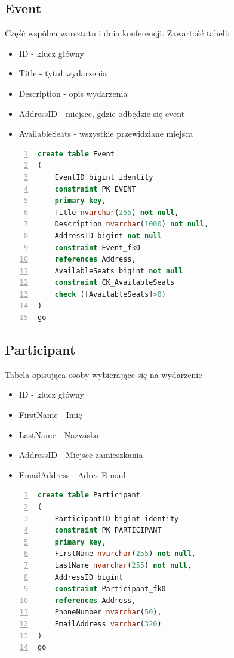 \documentclass[]{article}
\begin{document}
	\subsection{Event}
	Część wspólna warsztatu i dnia konferencji. Zawartość tabeli:
	\begin{itemize}
		\item ID - klucz główny
		\item Title - tytuł wydarzenia
		\item Description - opis wydarzenia
		\item AddressID - miejsce, gdzie odbędzie się event
		\item AvailableSeats - wszystkie przewidziane miejsca
	\end{itemize}
	\begin{lstlisting}[language=SQL,
						showspaces=false,
						basicstyle=\ttfamily,
						numbers=left,
						numberstyle=\tiny,
						backgroundcolor=\color{lightg},
						keywordstyle=\color{lightblue},
						commentstyle=\color{gray}]
create table Event
(
	EventID bigint identity
	constraint PK_EVENT
	primary key,
	Title nvarchar(255) not null,
	Description nvarchar(1000) not null,
	AddressID bigint not null
	constraint Event_fk0
	references Address,
	AvailableSeats bigint not null
	constraint CK_AvailableSeats
	check ([AvailableSeats]>0)
)
go
	\end{lstlisting}
	\subsection{Participant}
	Tabela opisująca osoby wybierające się na wydarzenie
	\begin{itemize}
		\item ID - klucz główny
		\item FirstName - Imię
		\item LastName - Nazwisko
		\item AddressID - Miejsce zamieszkania
		\item EmailAddress - Adres E-mail
	\end{itemize}
	\begin{lstlisting}[language=SQL,
						showspaces=false,
						basicstyle=\ttfamily,
						numbers=left,
						numberstyle=\tiny,
						backgroundcolor=\color{lightg},
						keywordstyle=\color{lightblue},
						commentstyle=\color{gray}]
create table Participant
(
	ParticipantID bigint identity
	constraint PK_PARTICIPANT
	primary key,
	FirstName nvarchar(255) not null,
	LastName nvarchar(255) not null,
	AddressID bigint
	constraint Participant_fk0
	references Address,
	PhoneNumber nvarchar(50),
	EmailAddress varchar(320)
)
go
	\end{lstlisting}
\end{document}
